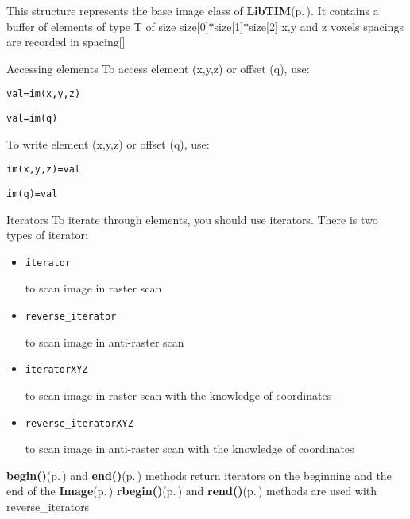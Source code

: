 This structure represents the base image class of {\bf Lib\-TIM}{\rm (p.\,\pageref{namespaceLibTIM})}. It contains a buffer of elements of type T of size size[0]$\ast$size[1]$\ast$size[2] x,y and z voxels spacings are recorded in spacing[] \begin{Desc}
\item[Accessing elements]To access element (x,y,z) or offset (q), use: 

\footnotesize\begin{verbatim}val=im(x,y,z) \end{verbatim}
\normalsize
 

\footnotesize\begin{verbatim}val=im(q) \end{verbatim}
\normalsize
 To write element (x,y,z) or offset (q), use: 

\footnotesize\begin{verbatim}im(x,y,z)=val \end{verbatim}
\normalsize
 

\footnotesize\begin{verbatim}im(q)=val \end{verbatim}
\normalsize
\end{Desc}
\begin{Desc}
\item[Iterators]To iterate through elements, you should use iterators. There is two types of iterator: \begin{itemize}
\item 

\footnotesize\begin{verbatim}iterator \end{verbatim}
\normalsize
 to scan image in raster scan \item 

\footnotesize\begin{verbatim}reverse_iterator \end{verbatim}
\normalsize
 to scan image in anti-raster scan \item 

\footnotesize\begin{verbatim}iteratorXYZ \end{verbatim}
\normalsize
 to scan image in raster scan with the knowledge of coordinates \item 

\footnotesize\begin{verbatim}reverse_iteratorXYZ \end{verbatim}
\normalsize
 to scan image in anti-raster scan with the knowledge of coordinates\end{itemize}
{\bf begin()}{\rm (p.\,\pageref{group__Image_ga33})} and {\bf end()}{\rm (p.\,\pageref{group__Image_ga35})} methods return iterators on the beginning and the end of the {\bf Image}{\rm (p.\,\pageref{classLibTIM_1_1Image})} {\bf rbegin()}{\rm (p.\,\pageref{group__Image_ga37})} and {\bf rend()}{\rm (p.\,\pageref{group__Image_ga39})} methods are used with reverse\_\-iterators \end{Desc}
